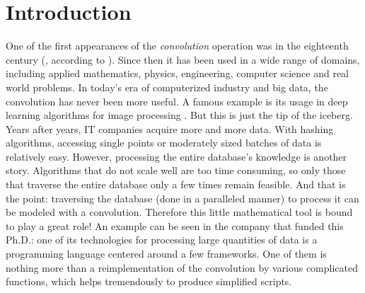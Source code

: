 \chapter*{Introduction}\label{chp:int}

One of the first appearances of the \emph{convolution} operation was in the eighteenth century (\cite{d1754traite}, according to \cite{dominguezorigin}). Since then it has been used in a wide range of domains, including applied mathematics, physics, engineering, computer science and real world problems. In today's era of computerized industry and big data, the convolution has never been more useful. A famous example is its usage in deep learning algorithms for image processing \citep{lecun2015deep}. But this is just the tip of the iceberg. Years after years, IT companies acquire more and more data. With hashing algorithms, accessing single points or moderately sized batches of data is relatively easy. However, processing the entire database's knowledge is another story. Algorithms that do not scale well are too time consuming, so only those that traverse the entire database only a few times remain feasible. And that is the point: traversing the database (done in a paralleled manner) to process it can be modeled with a convolution. Therefore this little mathematical tool is bound to play a great role! %
An example can be seen in the company that funded this Ph.D.: one of its technologies for processing large quantities of data is a programming language centered around a few frameworks. One of them %
is nothing more than a reimplementation of the convolution by various complicated functions, which helps tremendously to produce simplified scripts.


